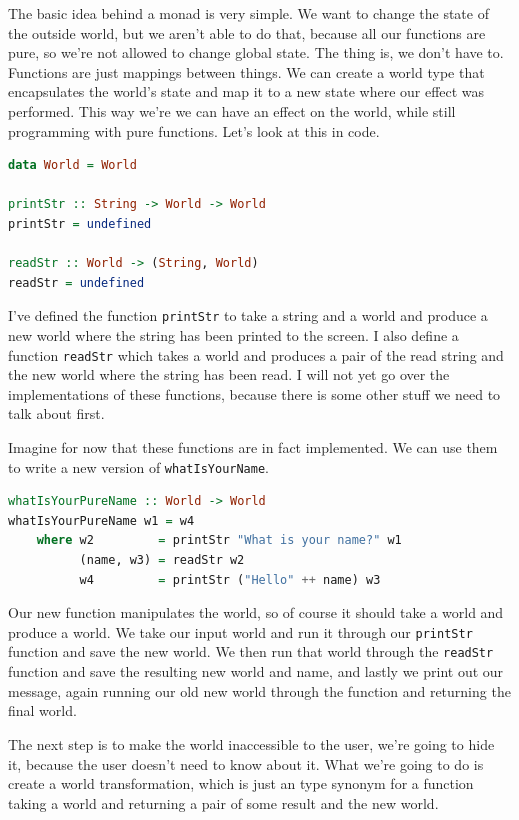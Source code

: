 \documentclass[11pt]{article}
\begin{document}

The basic idea behind a monad is very simple. We want to change the state of
the outside world, but we aren't able to do that, because all our functions are
pure, so we're not allowed to change global state. The thing is, we don't have
to. Functions are just mappings between things. We can create a world type that
encapsulates the world's state and map it to a new state where our effect was
performed. This way we're we can have an effect on the world, while still
programming with pure functions. Let's look at this in code.

\begin{lstlisting}[language=Haskell]
data World = World

printStr :: String -> World -> World
printStr = undefined

readStr :: World -> (String, World)
readStr = undefined
\end{lstlisting}

I've defined the function \texttt{printStr} to take a string and a world and
produce a new world where the string has been printed to the screen. I also
define a function \texttt{readStr} which takes a world and produces a pair of
the read string and the new world where the string has been read. I will not
yet go over the implementations of these functions, because there is some other
stuff we need to talk about first.

Imagine for now that these functions are in fact implemented. We can use them
to write a new version of \texttt{whatIsYourName}.

\begin{lstlisting}[language=Haskell]
whatIsYourPureName :: World -> World
whatIsYourPureName w1 = w4
    where w2         = printStr "What is your name?" w1
          (name, w3) = readStr w2
          w4         = printStr ("Hello" ++ name) w3
\end{lstlisting}

Our new function manipulates the world, so of course it should take a world and
produce a world. We take our input world and run it through our
\texttt{printStr} function and save the new world. We then run that world
through the \texttt{readStr} function and save the resulting new world and
name, and lastly we print out our message, again running our old new world
through the function and returning the final world.

The next step is to make the world inaccessible to the user, we're going to
hide it, because the user doesn't need to know about it. What we're going to do
is create a world transformation, which is just an type synonym for a function
taking a world and returning a pair of some result and the new world.
\end{document}
